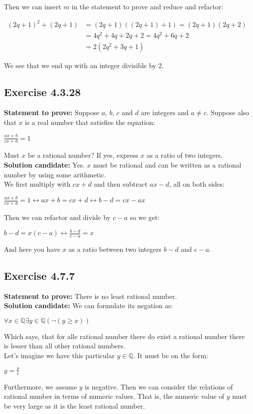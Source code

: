 \documentclass{report}
\newcommand{\cent}[1]{\begin{center}#1\end{center}}
\newcommand{\mAlign}[1]{\begin{align*}#1\end{align*}}
\newcommand{\doubleQ}{\mathbb{Q}}
\newcommand{\In}{\! \in \!}
\newcommand{\Prove}{\textbf{Statement to prove: }}
\newcommand{\solution}{\textbf{Solution candidate: }}
\newcommand{\QED}{\boxed{}}
\newcommand{\Exercise}[1]{\subsection{Exercise #1}}
\begin{document}
	Then we can insert $m$ in the statement to prove and reduce and refactor:
	
	\mAlign{(2q+1)^2 + (2q+1) &= (2q+1)((2q+1) + 1) = (2q+1)(2q+2) \\
					&= 4q^2 +4q + 2q +2 = 4q^2 +6q + 2 \\
					&= 2(2q^2+3q + 1)}
				
	We see that we end up with an integer divisible by 2.\\
	\QED
	
	\Exercise{4.3.28}
	
	\Prove
	Suppose $a$, $b$, $c$ and $d$ are integers and $a \neq c$. Suppose also that $x$ is a real number that satisfies the equation:
	
	\cent{$\frac{ax+b}{cx+d} = 1$}
	
	Must $x$ be a rational number? If yes, express $x$ as a ratio of two integers.\\
	
	\solution
	Yes. $x$ must be rational and can be written as a rational number by using some arithmetic.\\
	
	We first multiply with $cx+d$ and then subtract $ax - d$, all on both sides:
	 
	\cent{$\frac{ax+b}{cx+d} = 1 \leftrightarrow ax+b = cx+d \leftrightarrow b - d = cx - ax$}
	
	Then we can refactor and divide by $c-a$ so we get:
	
	\cent{$b -d = x(c-a) \leftrightarrow \frac{b-d}{c-a} = x$}
	
	And here you have $x$ as a ratio between two integers $b-d$ and $c-a$.\\
	\QED
	
	\Exercise{4.7.7}
	
	\Prove
	There is no least rational number.\\
	
	\solution
	We can formulate its negation as:
	
	\cent{$\forall x \In \doubleQ \exists y \in \doubleQ(\neg(y \geq x))$}
	
	Which says, that for alle rational number there do exist a rational number there is lesser than all other rational numbers.\\
	
	Let's imagine we have this particular $y \in \doubleQ$.  It must be on the form:
	
	\cent{$y = \frac{p}{r}$}
	
	Furthermore, we assume $y$ is negative. Then we can consider the relations of rational number in terms of numeric values. That is, the numeric value of $y$ must be very large as it is the least rational number. \\
	
\end{document}
